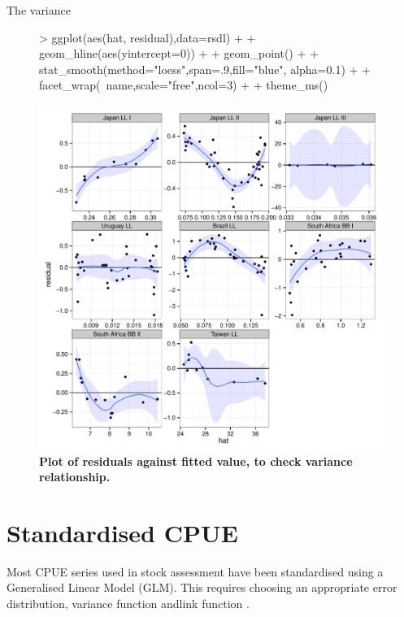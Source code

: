\documentclass[shortnames,nojss,article]{jss}
\begin{document}
The variance 
\begin{figure}\begin{center}
\begin{Schunk}
\begin{Sinput}
> ggplot(aes(hat, residual),data=rsdl)   +
+   geom_hline(aes(yintercept=0))         +
+   geom_point()                          +
+   stat_smooth(method="loess",span=.9,fill="blue", alpha=0.1)   +
+   facet_wrap(~name,scale="free",ncol=3) +
+              theme_ms()
\end{Sinput}
\end{Schunk}
\includegraphics{diags-017}
\caption{\bf{Plot of residuals against fitted value, to check variance relationship.}}
\label{residual:5}
\end{center}\end{figure}

\clearpage
\section{Standardised CPUE}

Most CPUE series used in stock assessment have been standardised using a Generalised Linear Model (GLM). This
requires choosing an appropriate error distribution, variance function andlink function \cite{mccullagh1989generalized}.
\end{document}
